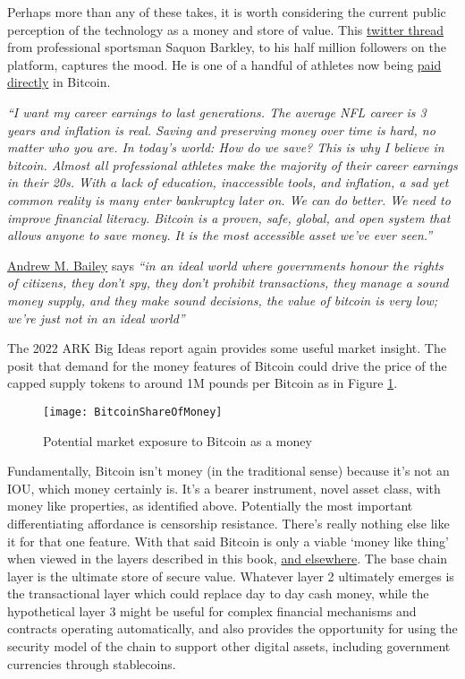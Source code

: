 Perhaps more than any of these takes, it is worth considering the current public perception of the technology as a money and store of value. This \href{https://twitter.com/saquon/status/1480738426236375041}{twitter thread} from professional sportsman Saquon Barkley, to his half million followers on the platform, captures the mood. He is one of a handful of athletes now being \href{https://www.buybitcoinworldwide.com/athletes/}{paid directly} in Bitcoin.\par
\textit{``I want my career earnings to last generations. The average NFL career is 3 years and inflation is real. Saving and preserving money over time is hard, no matter who you are.
In today’s world: How do we save? This is why I believe in bitcoin. Almost all professional athletes make the majority of their career earnings in their 20s. With a lack of education, inaccessible tools, and inflation, a sad yet common reality is many enter bankruptcy later on. We can do better. We need to improve financial literacy. Bitcoin is a proven, safe, global, and open system that allows anyone to save money. It is the most accessible asset we’ve ever seen.''}\par

\href{https://andrewmbailey.com/}{Andrew M. Bailey} says \textit{``in an ideal world where governments honour the rights of citizens, they don't spy, they don't prohibit transactions, they manage a sound money supply, and they make sound decisions, the value of bitcoin is very low; we're just not in an ideal world''}\par

The 2022 ARK Big Ideas report again provides some useful market insight. The posit that demand for the money features of Bitcoin could drive the price of the capped supply tokens to around 1M pounds per Bitcoin as in Figure \ref{fig:BitcoinShareOfMoney}.

\begin{figure}
  \centering
    \texttt{[image: BitcoinShareOfMoney]}
  \caption{Potential market exposure to Bitcoin as a money}
  \label{fig:BitcoinShareOfMoney}
\end{figure}

Fundamentally, Bitcoin isn't money (in the traditional sense) because it's not an IOU, which money certainly is. It's a bearer instrument, novel asset class, with money like properties, as identified above. Potentially the most important differentiating affordance is censorship resistance. There's really nothing else like it for that one feature. With that said Bitcoin is only a viable `money like thing' when viewed in the layers described in this book, \href{https://giacomozucco.com/layers-before-bitcoin}{and elsewhere}\cite{Bhatia2021}. The base chain layer is the ultimate store of secure value. Whatever layer 2 ultimately emerges is the transactional layer which could replace day to day cash money, while the hypothetical layer 3 might be useful for complex financial mechanisms and contracts operating automatically, and also provides the opportunity for using the security model of the chain to support other digital assets, including government currencies through stablecoins.
